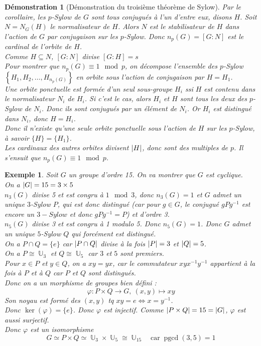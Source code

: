 \documentclass[a4paper, oneside]{report}
\theoremstyle{break}
\newtheorem{exemple}[thm]{Exemple}
\newtheorem*{demonstration}{Démonstration}
\newcommand{\mdg}{morphisme de groupes }
\newcommand{\x}{\times}
\DeclareMathOperator{\U}{\mathbb{U}}
\DeclarePairedDelimiter\ens{\left\{ }{\right\} }%
\DeclarePairedDelimiter\abs{\lvert}{\rvert}%
\DeclareMathOperator{\pgcd}{pgcd}
\renewcommand{\ens}[1]{\left\{ #1 \right\} }%
\begin{document}
\begin{demonstration}[Démonstration du troisième théorème de Sylow]
Par le corollaire, les $p$-Sylow de $G$ sont tous conjugués à l'un d'entre eux, disons $H$. Soit $N = N_G(H)$ le normalisateur de $H$. Alors $N$ est le stabilisateur de $H$ dans l'action de $G$ par conjugaison sur les $p$-Sylow. Donc $n_p(G) = [G:N]$ est le cardinal de l'orbite de $H$.\\
Comme $H \subseteq N$, $[G:N]$ divise $[G:H] = s$\\
Pour montrer que $n_p(G) \equiv 1 \mod p$, on décompose l'ensemble des $p$-Sylow $\ens{H_1, H_2, \ldots, H_{n_p(G)}}$ en orbite sous l'action de conjugaison par $H = H_1$.\\
Une orbite ponctuelle est formée d'un seul sous-groupe $H_i$ ssi $H$ est contenu dans le normalisateur  $N_i$ de $H_i$. Si c'est le cas, alors $H_i$ et $H$ sont tous les deux des $p$-Sylow de $N_i$. Donc ils sont conjugués par un élément de $N_i$. Or $H_i$ est distingué dans $N_i$, donc $H = H_i$.\\
Donc il n'existe qu'une seule orbite ponctuelle sous l'action de $H$ sur les $p$-Sylow, à savoir $\{H\} = \{H_1\}$.\\
Les cardinaux des autres orbites divisent $\abs{H}$, donc sont des multiples de $p$. Il s'ensuit que $n_p(G) \equiv 1 \mod p$.
\end{demonstration}

\begin{exemple}
Soit $G$ un groupe d'ordre 15. On va montrer que $G$ est cyclique.\\
On a $\abs{G} = 15 = 3 \times 5$\\
$n_3(G)$ divise 5 et est congru à $1 \mod 3$, donc $n_3(G) = 1$ et $G$ admet un unique $3$-Sylow $P$, qui est donc distingué (car pour $g\in G$, le conjugué $gPg^{-1}$ est encore un $3-Sylow$ et donc $gPg^{-1}= P$) et d'ordre 3.\\
$n_5(G)$ divise 3 et est congru à 1 modulo 5. Donc $n_5(G)=1$. Donc $G$ admet un unique $5$-Sylow $Q$ qui forcément est distingué.\\
On a $P\cap Q = \{e\}$ car $\abs{P\cap Q}$ divise à la fois $\abs{P}=3$ et $\abs{Q}=5$.\\
On a $P\cong \U_3$ et $Q\cong \U_5$ car $3$ et $5$ sont premiers.\\
Pour $x\in P$ et $y\in Q$, on a $xy=yx$, car le commutateur 
$xyx^{-1}y^{-1}$ appartient \`a la fois \`a $P$ et \`a $Q$ car $P$ et $Q$ sont distingués.\\
Donc on a un \mdg bien défini :
$$\varphi : P\x Q \rightarrow G,~(x,y)\mapsto xy$$
Son noyau est formé des $(x,y)$ tq $xy=e \Leftrightarrow x = y^{-1}$.\\
Donc $\ker (\varphi) = \{e\}$. Donc $\varphi$ est injectif. Comme $\abs{P\x Q}=15=\abs{G}$, $\varphi$ est aussi surjectif.\\
Donc $\varphi$ est un isomorphisme
\[
G \simeq P \times Q \simeq \U_3 \times \U_5 \cong \U_{15}	\quad	\text{car} \; \pgcd(3, 5) = 1
\]
\end{exemple}
\end{document}
